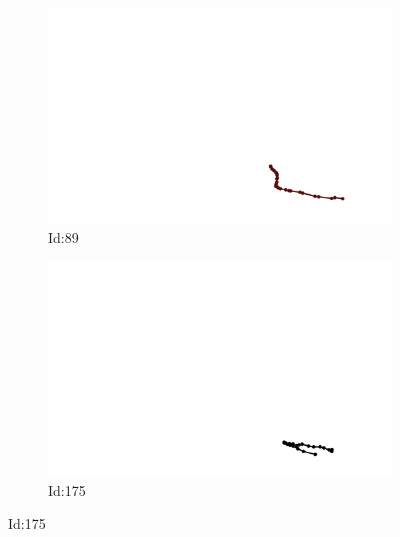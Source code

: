 \documentclass[12pt,twoside]{report}
\begin{document}
\begin{figure}
\centering
\begin{subfigure}[b]{0.20\textwidth}
\centering
\includegraphics[width=\textwidth]{../../trajectories/89.png}
\caption{Id:89}
\end{subfigure}
\begin{subfigure}[b]{0.20\textwidth}
\centering
\includegraphics[width=\textwidth]{../../trajectories/175.png}
\caption{Id:175}
\end{subfigure}
\end{figure}
\end{document}
